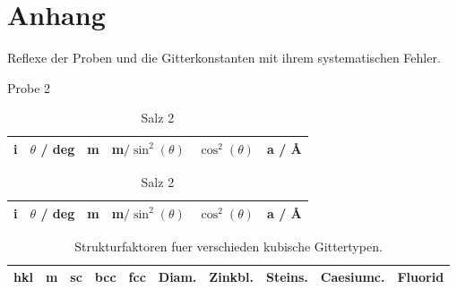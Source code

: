 \newpage
\section{Anhang}\label{sec:Anhang}

\begin{table}[ht]
		\centering
		\caption{Reflexe der Proben und die Gitterkonstanten mit ihrem
		systematischen Fehler.}
		\label{tab:wink}
		\begin{subtable}{\textwidth}
				\centering
				\caption{Probe 2}
				\begin{tabular}{c c c c c c}
						\toprule
						i & $\theta$ / deg & m & m$/\sin^2(\theta)$ & $\cos^2(\theta)$
						  & a / \AA \\ \midrule
						
						\bottomrule
				\end{tabular}
		\end{subtable}
		\begin{subtable}{\textwidth}
				\centering
				\caption{Salz 2}
				\begin{tabular}{c c c c c c}
						\toprule
						i & $\theta$ / deg & m & m$/\sin^2(\theta)$ & $\cos^2(\theta)$
						  & a / \AA \\ 
						\midrule
						
						\bottomrule
				\end{tabular}
		\end{subtable}
\end{table}

\begin{table}[ht]
		\centering
		\caption{Strukturfaktoren fuer verschieden kubische Gittertypen.}
		\label{tab:struct}
		\begin{tabular}{c c c c c c c c c c}
				\toprule
				hkl & m & sc & bcc & fcc & Diam. & Zinkbl. & Steins. & Caesiumc. & Fluorid \\ 
				\midrule
					
				\bottomrule
		\end{tabular}
\end{table}

